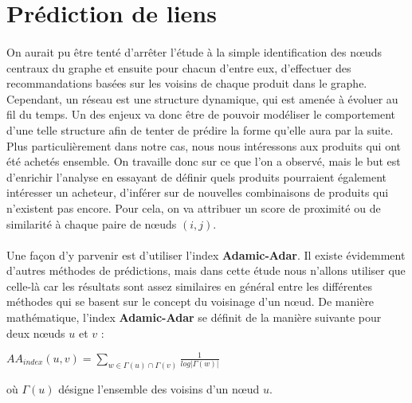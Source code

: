 \documentclass[14pt, openany]{article}
\begin{document}
\section{Prédiction de liens}
\paragraph{}
On aurait pu être tenté d'arrêter l'étude à la simple identification des nœuds centraux du graphe et ensuite pour chacun d'entre eux, d'effectuer des recommandations basées sur les voisins de chaque produit dans le graphe. Cependant, un réseau est une structure dynamique, qui est amenée à évoluer au fil du temps. Un des enjeux va donc être de pouvoir modéliser le comportement d'une telle structure afin de tenter de prédire la forme qu'elle aura par la suite. Plus particulièrement dans notre cas, nous nous intéressons aux produits qui ont été achetés ensemble. On travaille donc sur ce que l'on a observé, mais le but est d'enrichir l'analyse en essayant de définir quels produits pourraient également intéresser un acheteur, d'inférer sur de nouvelles combinaisons de produits qui n'existent pas encore. Pour cela, on va attribuer un score de \og proximité \fg{} ou de similarité à chaque paire de nœuds $(i,j)$.
\paragraph{}
Une façon d'y parvenir est d'utiliser l'index \textbf{Adamic-Adar}. Il existe évidemment d'autres méthodes de prédictions, mais dans cette étude nous n'allons utiliser que celle-là car les résultats sont assez similaires en général entre les différentes méthodes qui se basent sur le concept du voisinage d'un nœud. De manière mathématique, l'index \textbf{Adamic-Adar} se définit de la manière suivante pour deux nœuds $u$ et $v$ :\\
\begin{center}
$AA_{index}(u,v) = \sum\limits_{w \in \Gamma(u)\cap\Gamma(v)}\frac{1}{log|\Gamma(w)|}$
\end{center}
où $\Gamma(u)$ désigne l'ensemble des voisins d'un nœud $u$.
\end{document}
